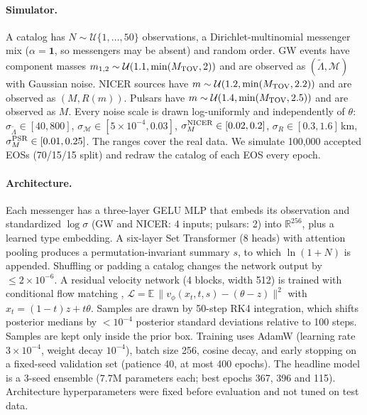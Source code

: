 \documentclass{article}
\newcommand{\Lt}{\tilde{\Lambda}}
\newcommand{\Mc}{\mathcal{M}}
\begin{document}
\paragraph{Simulator.} A catalog has $N\sim\mathcal{U}\{1,\dots,50\}$ observations, a Dirichlet-multinomial messenger mix ($\alpha=\mathbf{1}$, so messengers may be absent) and random order. GW events have component masses $m_{1,2}\sim\mathcal{U}(1.1,\min(M_{\rm TOV},2))$ and are observed as $(\Lt,\Mc)$ with Gaussian noise. NICER sources have $m\sim\mathcal{U}(1.2,\min(M_{\rm TOV},2.2))$ and are observed as $(M,R(m))$. Pulsars have $m\sim\mathcal{U}(1.4,\min(M_{\rm TOV},2.5))$ and are observed as $M$. Every noise scale is drawn log-uniformly and independently of $\theta$: $\sigma_{\Lt}\in[40,800]$, $\sigma_{\Mc}\in[5\!\times\!10^{-4},0.03]$, $\sigma_M^{\rm NICER}\in[0.02,0.2]$, $\sigma_R\in[0.3,1.6]$\,km, $\sigma_M^{\rm PSR}\in[0.01,0.25]$. The ranges cover the real data. We simulate 100,000 accepted EOSs (70/15/15 split) and redraw the catalog of each EOS every epoch.

\paragraph{Architecture.} Each messenger has a three-layer GELU MLP that embeds its observation and standardized $\log\sigma$ (GW and NICER: 4 inputs; pulsars: 2) into $\mathbb{R}^{256}$, plus a learned type embedding. A six-layer Set Transformer \citep{lee2019set} (8 heads) with attention pooling produces a permutation-invariant summary $s$, to which $\ln(1+N)$ is appended. Shuffling or padding a catalog changes the network output by $\le2\times10^{-6}$. A residual velocity network (4 blocks, width 512) is trained with conditional flow matching \citep{lipman2023flow,wildberger2023flow}, $\mathcal{L}=\mathbb{E}\,\|v_\phi(x_t,t,s)-(\theta-z)\|^2$ with $x_t=(1-t)z+t\theta$. Samples are drawn by 50-step RK4 integration, which shifts posterior medians by $<10^{-4}$ posterior standard deviations relative to 100 steps. Samples are kept only inside the prior box. Training uses AdamW (learning rate $3\times10^{-4}$, weight decay $10^{-4}$), batch size 256, cosine decay, and early stopping on a fixed-seed validation set (patience 40, at most 400 epochs). The headline model is a 3-seed ensemble ($7.7$M parameters each; best epochs 367, 396 and 115). Architecture hyperparameters were fixed before evaluation and not tuned on test data.
\end{document}
